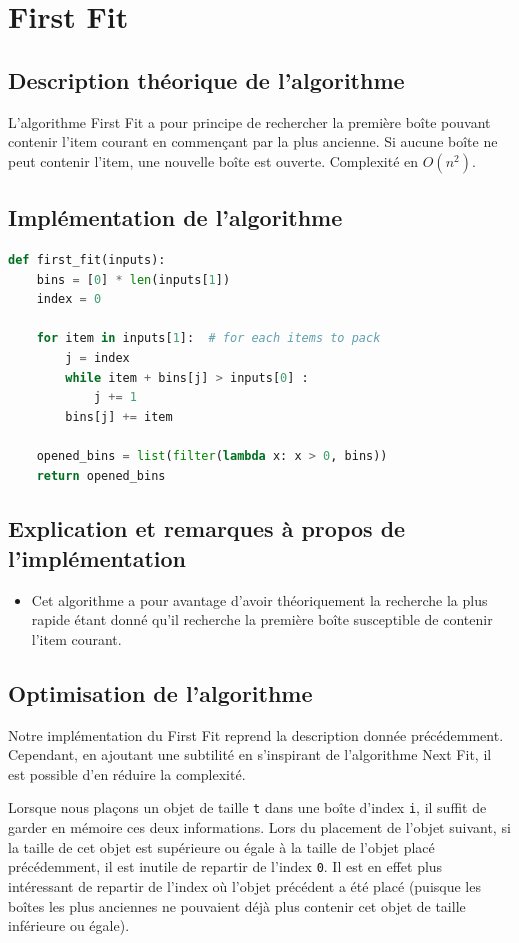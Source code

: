 \documentclass{article}
\begin{document}
\section{First Fit}
\subsection{Description théorique de l'algorithme}
L'algorithme First Fit a pour principe de rechercher la première boîte pouvant contenir l'item courant en commençant par la plus ancienne. Si aucune boîte ne peut contenir l'item, une nouvelle boîte est ouverte.
Complexité en $O(n^2)$.

\subsection{Implémentation de l'algorithme}
\begin{lstlisting}[language=Python, frame=single]
def first_fit(inputs):
    bins = [0] * len(inputs[1])
    index = 0
    
    for item in inputs[1]:  # for each items to pack
        j = index
        while item + bins[j] > inputs[0] :
            j += 1
        bins[j] += item
       
    opened_bins = list(filter(lambda x: x > 0, bins))
    return opened_bins
\end{lstlisting}

\subsection{Explication et remarques à propos de l'implémentation}
\begin{itemize}
  \item Cet algorithme a pour avantage d'avoir théoriquement la recherche la plus rapide étant donné qu'il recherche la première boîte susceptible de contenir l'item courant.
\end{itemize}

\subsection{Optimisation de l'algorithme}
Notre implémentation du First Fit reprend la description donnée précédemment. Cependant, en ajoutant une subtilité en s'inspirant de l'algorithme Next Fit, il est possible d'en réduire la complexité.

Lorsque nous plaçons un objet de taille \texttt{t} dans une boîte d'index \texttt{i}, il suffit de garder en mémoire ces deux informations.
Lors du placement de l'objet suivant, si la taille de cet objet est supérieure ou égale à la taille de l'objet placé précédemment,
il est inutile de repartir de l'index \texttt{0}. Il est en effet plus intéressant de repartir de l'index où l'objet précédent a été placé (puisque les boîtes les plus anciennes ne pouvaient déjà plus contenir cet objet de taille inférieure ou égale).
\end{document}

